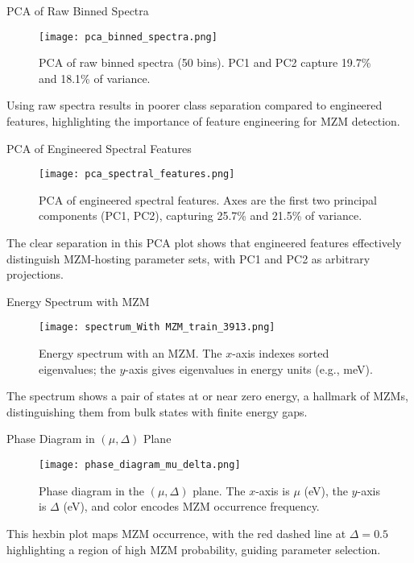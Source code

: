 \documentclass[aspectratio=169]{beamer}
\begin{document}
\begin{frame}{PCA of Raw Binned Spectra}
  \tiny

  \begin{figure}
    \centering
    \texttt{[image: pca\_binned\_spectra.png]}
    \captionsetup{labelformat=empty,font=tiny}
    \caption{PCA of raw binned spectra (50 bins). PC1 and PC2 capture 19.7\% and 18.1\% of variance.}
  \end{figure}

  Using raw spectra results in poorer class separation compared to engineered features, highlighting the importance of feature engineering for MZM detection.
\end{frame}

\begin{frame}{PCA of Engineered Spectral Features}
  \tiny

  \begin{figure}
    \centering
    \texttt{[image: pca\_spectral\_features.png]}
    \captionsetup{labelformat=empty,font=tiny}
    \caption{PCA of engineered spectral features. Axes are the first two principal components (PC1, PC2), capturing 25.7\% and 21.5\% of variance.}
  \end{figure}

  The clear separation in this PCA plot shows that engineered features effectively distinguish MZM-hosting parameter sets, with PC1 and PC2 as arbitrary projections.
\end{frame}


\begin{frame}{Energy Spectrum with MZM}
  \tiny

  \begin{figure}
    \centering
    \texttt{[image: spectrum\_With MZM\_train\_3913.png]}
    \captionsetup{labelformat=empty,font=tiny}
    \caption{Energy spectrum with an MZM. The $x$-axis indexes sorted eigenvalues; the $y$-axis gives eigenvalues in energy units (e.g., meV).}
  \end{figure}

  The spectrum shows a pair of states at or near zero energy, a hallmark of MZMs, distinguishing them from bulk states with finite energy gaps.
\end{frame}


\begin{frame}{Phase Diagram in $(\mu, \Delta)$ Plane}
  \tiny

  \begin{figure}
    \centering
    \texttt{[image: phase\_diagram\_mu\_delta.png]}
    \captionsetup{labelformat=empty,font=tiny}
    \caption{Phase diagram in the $(\mu, \Delta)$ plane. The $x$-axis is $\mu$ (eV), the $y$-axis is $\Delta$ (eV), and color encodes MZM occurrence frequency.}
  \end{figure}

  This hexbin plot maps MZM occurrence, with the red dashed line at $\Delta = 0.5$ highlighting a region of high MZM probability, guiding parameter selection.
\end{frame}
\end{document}
